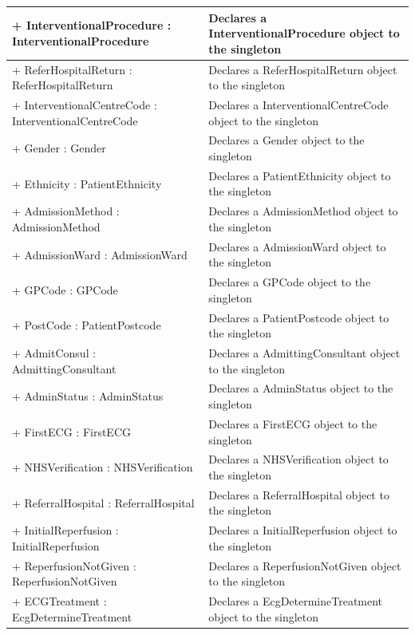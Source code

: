 \documentclass[12pt,a4paper,oneside,titlepage]{article}
\begin{document}
\begin{center}
	\begin{tabular}{| p{13cm} | p{5cm} |}
	\hline
+ InterventionalProcedure : InterventionalProcedure	 & Declares a InterventionalProcedure object to the singleton\\ \hline
+ ReferHospitalReturn : ReferHospitalReturn & 	Declares a ReferHospitalReturn object to the singleton\\ \hline
+ InterventionalCentreCode : InterventionalCentreCode & 	Declares a InterventionalCentreCode object to the singleton\\ \hline
+ Gender : Gender & 	Declares a Gender object to the singleton\\ \hline
+ Ethnicity : PatientEthnicity & 	Declares a PatientEthnicity object to the singleton\\ \hline
+ AdmissionMethod : AdmissionMethod & 	Declares a AdmissionMethod object to the singleton\\ \hline
+ AdmissionWard : AdmissionWard & 	Declares a AdmissionWard object to the singleton\\ \hline
+ GPCode : GPCode	 & Declares a GPCode object to the singleton\\ \hline
+ PostCode : PatientPostcode & 	Declares a PatientPostcode object to the singleton\\ \hline
+ AdmitConsul : AdmittingConsultant	 & Declares a AdmittingConsultant object to the singleton\\ \hline
+ AdminStatus : AdminStatus	 & Declares a AdminStatus object to the singleton\\ \hline
+ FirstECG : FirstECG	 & Declares a FirstECG object to the singleton\\ \hline
+ NHSVerification : NHSVerification	 & Declares a NHSVerification object to the singleton\\ \hline
+ ReferralHospital : ReferralHospital	 & Declares a ReferralHospital object to the singleton\\ \hline
+ InitialReperfusion : InitialReperfusion	 & Declares a InitialReperfusion object to the singleton\\ \hline
+ ReperfusionNotGiven : ReperfusionNotGiven	 & Declares a ReperfusionNotGiven object to the singleton\\ \hline
+ ECGTreatment : EcgDetermineTreatment	 & Declares a EcgDetermineTreatment object to the singleton\\ \hline
\end{tabular}
\end{center}
\end{document}
